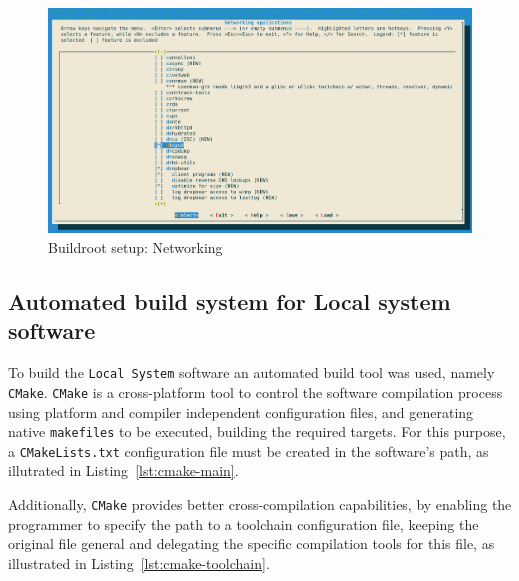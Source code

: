 % 
\begin{figure}[htb!]
\centering
    \includegraphics[width=0.8\columnwidth]{./img/buildroot-cfg-4.png}
  \caption{Buildroot setup: Networking}%
\label{fig:buildroot-cfg-4}
\end{figure}


\subsection{Automated build system for Local system software}
\label{sec:buildr-conf}
To build the \texttt{Local System} software an automated build tool was used,
namely \texttt{CMake}. \texttt{CMake} is a cross-platform tool to control the
software compilation process using platform and compiler independent
configuration files, and generating native \texttt{makefiles} to be executed,
building the required targets. For this purpose, a \texttt{CMakeLists.txt}
configuration file must be created in the software's path, as illutrated in Listing~\ref{lst:cmake-main}.



Additionally, \texttt{CMake} provides better cross-compilation capabilities, by
enabling the programmer to specify the path to a toolchain configuration file,
keeping the original file general and delegating the specific compilation tools
for this file, as illustrated in Listing~\ref{lst:cmake-toolchain}.





